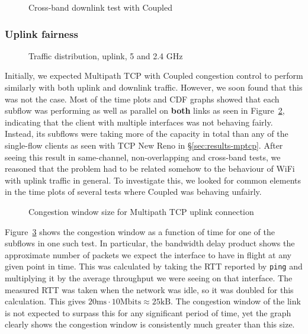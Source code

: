 \begin{figure}[h]
 \centering
 
 \caption{Cross-band downlink test with Coupled}\label{graph:cb-fairness-down}
\end{figure}

\subsubsection{Uplink fairness}
\label{sec:results-fairness:up}

\begin{figure}[h]
 \centering
 
 \caption{Traffic distribution, uplink, 5 and 2.4 GHz}\label{graph:up-fair}
\end{figure}

Initially, we expected Multipath TCP with Coupled congestion control to perform
similarly with both uplink and downlink traffic. However, we soon found that
this was not the case. Most of the time plots and CDF graphs showed that each
subflow was performing as well as parallel on \textbf{both} links as seen in
Figure~\ref{graph:up-fair}, indicating that the client with multiple interfaces
was not behaving fairly. Instead, its subflows were taking more of the capacity
in total than any of the single-flow clients as seen with TCP New Reno in
\S\ref{sec:results-mptcp}. After seeing this result in same-channel,
non-overlapping and cross-band tests, we reasoned that the problem had to be
related somehow to the behaviour of WiFi with uplink traffic in general. To
investigate this, we looked for common elements in the time plots of several
tests where Coupled was behaving unfairly.

\begin{figure}[h]
 \centering
 
 \caption{Congestion window size for Multipath TCP uplink connection}\label{graph:fairness-up-close}
\end{figure}

Figure~\ref{graph:fairness-up-close} shows the congestion window as a function
of time for one of the subflows in one such test. In particular, the bandwidth
delay product shows the approximate number of packets we expect the interface to
have in flight at any given point in time. This was calculated by taking the RTT
reported by \texttt{ping} and multiplying it by the average throughput we were
seeing on that interface. The measured RTT was taken when the network was idle,
so it was doubled for this calculation. This gives $20\text{ms} \cdot
10\text{Mbits} \approx 25\text{kB}$. The congestion window of the link is not
expected to surpass this for any significant period of time, yet the graph
clearly shows the congestion window is consistently much greater than this size.

